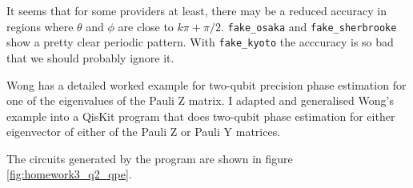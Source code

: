 \documentclass[12pt]{extarticle}
\begin{document}
It seems that for some providers at least, there may be a reduced accuracy in regions
where $\theta$ and $\phi$ are close to $k\pi+\pi/2$.
\texttt{fake\_osaka} and \texttt{fake\_sherbrooke} show a pretty clear periodic pattern.
With \texttt{fake\_kyoto} the acccuracy is so bad that we should probably ignore it.

\newpage
{}

Wong\cite{wong2024} has a detailed worked example for two-qubit precision phase estimation for one of the eigenvalues of the Pauli Z matrix.
I adapted and generalised Wong's example into a QisKit program that does two-qubit phase estimation for either eigenvector of either of the Pauli Z or Pauli Y matrices.

The circuits generated by the program are shown in figure \ref{fig:homework3_q2_qpe}.
\end{document}
